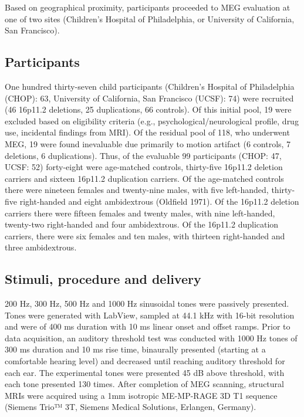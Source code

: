 \documentclass{article}
\begin{document}
\medskip

Based on geographical proximity, participants proceeded to MEG evaluation at one of two sites (Children’s Hospital of Philadelphia, or University of California, San Francisco).  

\medskip

\subsection*{Participants}

One hundred thirty-seven child participants (Children’s Hospital of Philadelphia (CHOP): 63, University of California, San Francisco (UCSF): 74) were recruited (46 16p11.2 deletions, 25 duplications, 66 controls). Of this initial pool, 19 were excluded based on eligibility criteria (e.g., psychological/neurological profile, drug use, incidental findings from MRI). Of the residual pool of 118, who underwent MEG, 19 were found inevaluable due primarily to motion artifact (6 controls, 7 deletions, 6 duplications). Thus, of the evaluable 99 participants (CHOP: 47, UCSF: 52) forty-eight were age-matched controls, thirty-five 16p11.2 deletion carriers and sixteen 16p11.2 duplication carriers. Of the age-matched controls there were nineteen females and twenty-nine males, with five left-handed, thirty-five right-handed and eight ambidextrous (Oldfield 1971).  Of the 16p11.2 deletion carriers there were fifteen females and twenty males, with nine left-handed, twenty-two right-handed and four ambidextrous.  Of the 16p11.2 duplication carriers, there were six females and ten males, with thirteen right-handed and three ambidextrous.  

\medskip

\subsection*{Stimuli, procedure and delivery}

200 Hz, 300 Hz, 500 Hz and 1000 Hz sinusoidal tones were passively presented. Tones were generated with LabView, sampled at 44.1 kHz with 16-bit resolution and were of 400 ms duration with 10 ms linear onset and offset ramps. Prior to data acquisition, an auditory threshold test was conducted with 1000 Hz tones of 300 ms duration and 10 ms rise time, binaurally presented (starting at a comfortable hearing level) and decreased until reaching auditory threshold for each ear.  The experimental tones were presented 45 dB above threshold, with each tone presented 130 times.  After completion of MEG scanning, structural MRIs were acquired using a 1mm isotropic ME-MP-RAGE 3D T1 sequence (Siemens Trio™ 3T, Siemens Medical Solutions, Erlangen, Germany).  
\end{document}
